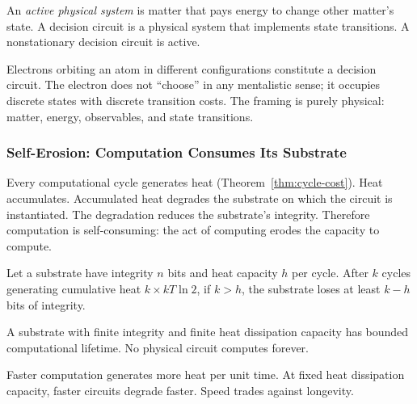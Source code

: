 \begin{definition}\label{def:active-matter-system}
An \emph{active physical system} is matter that pays energy to change other matter's state. A decision circuit is a physical system that implements state transitions. A nonstationary decision circuit is active.
\end{definition}

\begin{remark}
Electrons orbiting an atom in different configurations constitute a decision circuit. The electron does not ``choose'' in any mentalistic sense; it occupies discrete states with discrete transition costs. The framing is purely physical: matter, energy, observables, and state transitions.
\end{remark}

\subsubsection{Self-Erosion: Computation Consumes Its Substrate}\label{sec:self-erosion}

Every computational cycle generates heat (Theorem~\ref{thm:cycle-cost}). Heat accumulates. Accumulated heat degrades the substrate on which the circuit is instantiated. The degradation reduces the substrate's integrity. Therefore computation is self-consuming: the act of computing erodes the capacity to compute.

\begin{theorem}\label{thm:substrate-degradation}
Let a substrate have integrity $n$ bits and heat capacity $h$ per cycle. After $k$ cycles generating cumulative heat $k \times kT\ln 2$, if $k > h$, the substrate loses at least $k - h$ bits of integrity.
\end{theorem}

\begin{corollary}\label{cor:finite-lifetime}
A substrate with finite integrity and finite heat dissipation capacity has bounded computational lifetime. No physical circuit computes forever.
\end{corollary}

\begin{corollary}\label{cor:speed-integrity}
Faster computation generates more heat per unit time. At fixed heat dissipation capacity, faster circuits degrade faster. Speed trades against longevity.
\end{corollary}

